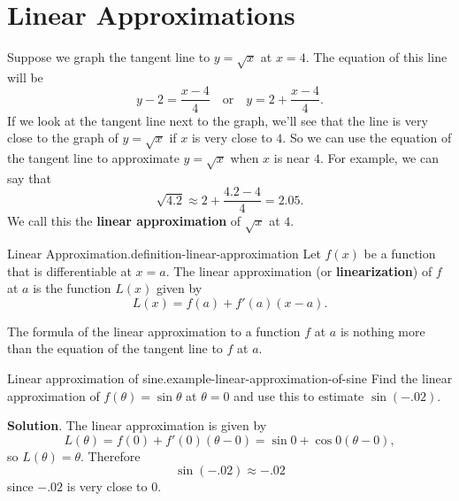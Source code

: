 \documentclass[10pt,]{book}
\newcommand{\terminology}[1]{\textbf{#1}}
\numberwithin{equation}{section}
\begin{document}
%
%
\typeout{************************************************}
\typeout{************************************************}
%
\section[{Linear Approximations}]{Linear Approximations}\label{section-linear-approximations}
\hypertarget{p-176}{}%
Suppose we graph the tangent line to \(y=\sqrt{x}\) at \(x=4\). The equation of this line will be%
\begin{equation*}
y-2 = \frac{x-4}{4}\quad\text{or}\quad y= 2 + \frac{x-4}{4}.
\end{equation*}
If we look at the tangent line next to the graph, we'll see that the line is very close to the graph of \(y=\sqrt{x}\) if \(x\) is very close to \(4\). So we can use the equation of the tangent line to approximate \(y=\sqrt{x}\) when \(x\) is near \(4\). For example, we can say that%
\begin{equation*}
\sqrt{4.2} \approx 2 + \frac{4.2 - 4}{4} = 2.05.
\end{equation*}
We call this the \terminology{linear approximation} of \(\sqrt{x}\) at \(4\).%
\begin{definition}{Linear Approximation.}{definition-linear-approximation}%
\hypertarget{p-177}{}%
Let \(f(x)\) be a function that is differentiable at \(x=a\). The linear approximation (or \terminology{linearization}) of \(f\) at \(a\) is the function \(L(x)\) given by%
\begin{equation*}
L(x) = f(a) + f'(a)(x-a).
\end{equation*}
%
\end{definition}
\hypertarget{p-178}{}%
The formula of the linear approximation to a function \(f\) at \(a\) is nothing more than the equation of the tangent line to \(f\) at \(a\).%
\begin{example}{Linear approximation of sine.}{example-linear-approximation-of-sine}%
\hypertarget{p-179}{}%
Find the linear approximation of \(f(\theta) = \sin\theta\) at \(\theta=0\) and use this to estimate \(\sin(-.02)\).%
\par\smallskip%
\noindent\textbf{Solution}.\hypertarget{solution-39}{}\quad%
\hypertarget{p-180}{}%
The linear approximation is given by%
\begin{equation*}
L(\theta) = f(0) + f'(0)(\theta - 0) = \sin0 + \cos0 (\theta - 0),
\end{equation*}
so \(L(\theta) = \theta\). Therefore%
\begin{equation*}
\sin(-.02)\approx-.02
\end{equation*}
since \(-.02\) is very close to \(0\).%
\end{example}
\end{document}
